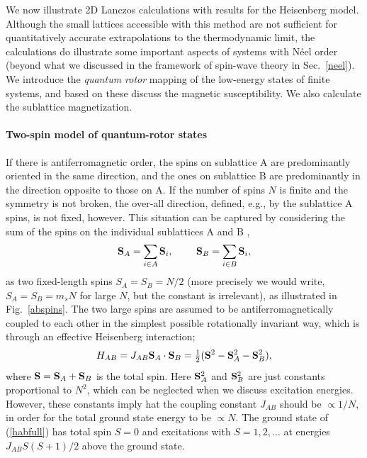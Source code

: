 \documentclass[draft,numberedheadings]{aipproc}
\newcommand{\half}{\hbox{$\frac{1}{2}$}}
\begin{document}
We now illustrate 2D Lanczos calculations with results for the Heisenberg model. Although the small lattices accessible with this method are not 
sufficient for quantitatively accurate extrapolations to the thermodynamic limit, the calculations do illustrate some important aspects of systems 
with N\'eel order (beyond what we discussed in the framework of spin-wave theory in Sec.~\ref{neel}). We introduce the {\it quantum rotor} mapping 
of the low-energy states of finite systems, and based on these discuss the magnetic susceptibility. We also calculate the sublattice magnetization.

\paragraph{Two-spin model of quantum-rotor states}

If there is antiferromagnetic order, the spins on sublattice A are predominantly oriented in the same direction, and the ones on sublattice 
B are predominantly in the direction opposite to those on A. If the number of spins $N$ is finite and the symmetry is not broken,
the over-all direction, defined, e.g., by the sublattice A spins, is not fixed, however. This situation can be captured by considering the sum
of the spins on the individual sublattices A and B \cite{anderson59},
\begin{equation}
{\bf S}_A = \sum_{i \in A} {\bf S}_i,~~~~~~~{\bf S}_B = \sum_{i \in B} {\bf S}_i,
\end{equation}
as two fixed-length spins $S_A=S_B= N/2$ (more precisely we would write, $S_A=S_B=m_sN$ for large $N$, but the constant is irrelevant), 
as illustrated in Fig.~\ref{abspins}. The two large spins are assumed to be antiferromagnetically coupled to each other in the 
simplest possible rotationally invariant way, which is through an effective Heisenberg interaction;
\begin{equation}
H_{AB} = J_{AB}{\bf S}_A \cdot {\bf S}_B = \half ({\bf S}^2 - {\bf S}^2_A - {\bf S}^2_B),
\label{habfull}
\end{equation}
where ${\bf S} = {\bf S}_A + {\bf S}_B$ is the total spin. Here ${\bf S}_A^2$ and ${\bf S}^2_B$ are just constants proportional to $N^2$, 
which can be neglected when we discuss excitation energies. However, these constants imply hat the coupling constant $J_{AB}$ should be 
$\propto 1/N$, in order for the total ground state energy to be $\propto N$. The ground state of (\ref{habfull}) has total spin $S=0$ and 
excitations with $S=1,2,\ldots$ at energies $J_{AB}S(S+1)/2$ above the ground state. 
\end{document}
